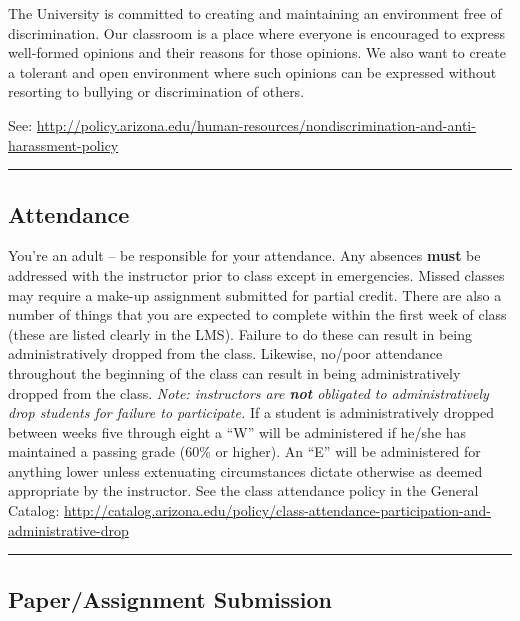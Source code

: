 \documentclass[]{article}
\begin{document}
The University is committed to creating and maintaining an environment
free of discrimination. Our classroom is a place where everyone is
encouraged to express well-formed opinions and their reasons for those
opinions. We also want to create a tolerant and open environment where
such opinions can be expressed without resorting to bullying or
discrimination of others.

See:
\url{http://policy.arizona.edu/human-resources/nondiscrimination-and-anti-harassment-policy}

\begin{center}\rule{0.5\linewidth}{\linethickness}\end{center}

\hypertarget{attendance}{%
\subsection{Attendance}\label{attendance}}

You're an adult -- be responsible for your attendance. Any absences
\textbf{must} be addressed with the instructor prior to class except in
emergencies. Missed classes may require a make-up assignment submitted
for partial credit. There are also a number of things that you are
expected to complete within the first week of class (these are listed
clearly in the LMS). Failure to do these can result in being
administratively dropped from the class. Likewise, no/poor attendance
throughout the beginning of the class can result in being
administratively dropped from the class. \emph{Note: instructors are
\textbf{\emph{not}} obligated to administratively drop students for
failure to participate.} If a student is administratively dropped
between weeks five through eight a ``W'' will be administered if he/she
has maintained a passing grade (60\% or higher). An ``E'' will be
administered for anything lower unless extenuating circumstances dictate
otherwise as deemed appropriate by the instructor. See the class
attendance policy in the General Catalog:
\url{http://catalog.arizona.edu/policy/class-attendance-participation-and-administrative-drop}

\begin{center}\rule{0.5\linewidth}{\linethickness}\end{center}

\hypertarget{paperassignment-submission}{%
\subsection{Paper/Assignment
Submission}\label{paperassignment-submission}}
\end{document}
